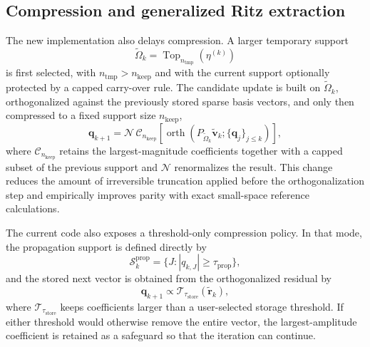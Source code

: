 \documentclass[aip,jcp,preprint,longbibliography]{revtex4-2}
\begin{document}
\subsection{Compression and generalized Ritz extraction}
The new implementation also delays compression. A larger temporary support
\begin{equation}
\widetilde \Omega_k = \operatorname{Top}_{n_{\mathrm{tmp}}}\!\left(\eta^{(k)}\right)
\end{equation}
is first selected, with $n_{\mathrm{tmp}} > n_{\mathrm{keep}}$ and with the current support optionally protected by a capped carry-over rule. The candidate update is built on $\widetilde \Omega_k$, orthogonalized against the previously stored sparse basis vectors, and only then compressed to a fixed support size $n_{\mathrm{keep}}$,
\begin{equation}
\bm q_{k+1}
 = \mathcal{N}\,
\mathcal{C}_{n_{\mathrm{keep}}}
\!\left[
\operatorname{orth}\!\left(P_{\widetilde \Omega_k}\widetilde{\bm v}_k;\{\bm q_j\}_{j\le k}\right)
\right],
\end{equation}
where $\mathcal{C}_{n_{\mathrm{keep}}}$ retains the largest-magnitude coefficients together with a capped subset of the previous support and $\mathcal{N}$ renormalizes the result. This change reduces the amount of irreversible truncation applied before the orthogonalization step and empirically improves parity with exact small-space reference calculations.

The current code also exposes a threshold-only compression policy. In that mode,
the propagation support is defined directly by
\begin{equation}
\mathcal{S}_k^{\mathrm{prop}}
=
\{J: |q_{k,J}| \ge \tau_{\mathrm{prop}}\},
\end{equation}
and the stored next vector is obtained from the orthogonalized residual by
\begin{equation}
\bm q_{k+1}
\propto
\mathcal{T}_{\tau_{\mathrm{store}}}\!\left(\widetilde{\bm r}_k\right),
\end{equation}
where $\mathcal{T}_{\tau_{\mathrm{store}}}$ keeps coefficients larger than a
user-selected storage threshold. If either threshold would otherwise remove the
entire vector, the largest-amplitude coefficient is retained as a safeguard so
that the iteration can continue.
\end{document}
